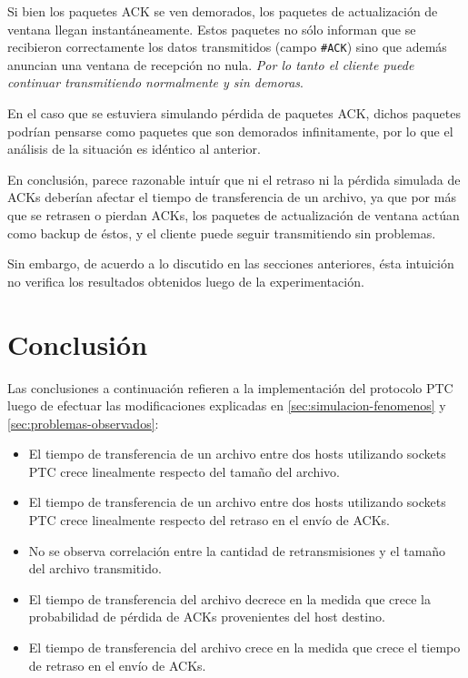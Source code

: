 \documentclass[a4paper, 10pt, twoside]{article}
\newcommand{\ack}{\texttt{\#ACK}\xspace}
\begin{document}
Si bien los paquetes ACK se ven demorados, los paquetes de actualización de ventana llegan instantáneamente. Estos paquetes no sólo informan que se recibieron correctamente los datos transmitidos (campo \ack) sino que además anuncian una ventana de recepción no nula. \emph{Por lo tanto el cliente puede continuar transmitiendo normalmente y sin demoras}.

En el caso que se estuviera simulando pérdida de paquetes ACK, dichos paquetes podrían pensarse como paquetes que son demorados infinitamente, por lo que el análisis de la situación es idéntico al anterior.

En conclusión, parece razonable intuír que ni el retraso ni la pérdida simulada de ACKs deberían afectar el tiempo de transferencia de un archivo, ya que por más que se retrasen o pierdan ACKs, los paquetes de actualización de ventana actúan como backup de éstos, y el cliente puede seguir transmitiendo sin problemas.

Sin embargo, de acuerdo a lo discutido en las secciones anteriores, ésta intuición no verifica los resultados obtenidos luego de la experimentación.




\section{Conclusión}

Las conclusiones a continuación refieren a la implementación del protocolo PTC luego de efectuar las modificaciones explicadas en \ref{sec:simulacion-fenomenos} y \ref{sec:problemas-observados}:

\begin{itemize}
  \item El tiempo de transferencia de un archivo entre dos hosts utilizando sockets PTC crece linealmente respecto del tamaño del archivo.

  \item El tiempo de transferencia de un archivo entre dos hosts utilizando sockets PTC crece linealmente respecto del retraso en el envío de ACKs.

  \item No se observa correlación entre la cantidad de retransmisiones y el tamaño del archivo transmitido.

  \item El tiempo de transferencia del archivo decrece en la medida que crece la probabilidad de pérdida de ACKs provenientes del host destino.

  \item El tiempo de transferencia del archivo crece en la medida que crece el tiempo de retraso en el envío de ACKs.
\end{itemize}
\end{document}
